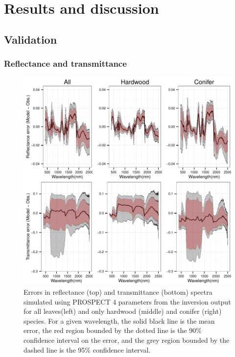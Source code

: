 \section{Results and discussion} \label{s:results}

\subsection{Validation}

\subsubsection{Reflectance and transmittance} \label{sss:refltrans}

\begin{figure}[h] \centering
  \centerline{\includegraphics{figures/refltrans-validation}}
  \caption{
    Errors in reflectance (top) and transmittance (bottom) spectra simulated
    using PROSPECT 4 parameters from the inversion output for all leaves(left)
    and only hardwood (middle) and conifer (right) species. For a given
    wavelength, the solid black line is the mean error, the red region bounded
    by the dotted line is the 90\% confidence interval on the error, and the
    grey region bounded by the dashed line is the 95\% confidence interval.
  }
  \label{fig:refltrans}
\end{figure}

